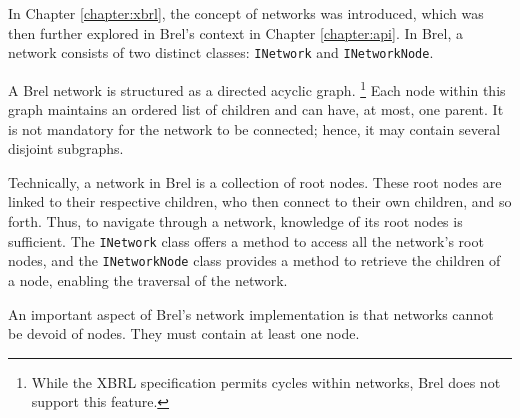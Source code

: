 In Chapter \ref{chapter:xbrl}, the concept of networks was introduced, which was then further explored in Brel's context in Chapter \ref{chapter:api}.
In Brel, a network consists of two distinct classes: \texttt{INetwork} and \texttt{INetworkNode}.

A Brel network is structured as a directed acyclic graph.
\footnote{While the XBRL specification permits cycles within networks, Brel does not support this feature.}
Each node within this graph maintains an ordered list of children and can have, at most, one parent.
It is not mandatory for the network to be connected; hence, it may contain several disjoint subgraphs.

Technically, a network in Brel is a collection of root nodes.
These root nodes are linked to their respective children, who then connect to their own children, and so forth.
Thus, to navigate through a network, knowledge of its root nodes is sufficient.
The \texttt{INetwork} class offers a method to access all the network's root nodes,
and the \texttt{INetworkNode} class provides a method to retrieve the children of a node,
enabling the traversal of the network.

An important aspect of Brel’s network implementation is that networks cannot be devoid of nodes.
They must contain at least one node.





